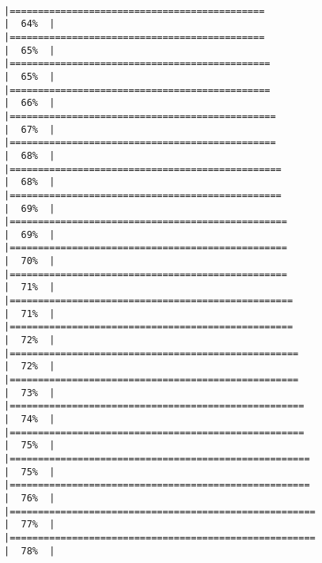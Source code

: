 \documentclass[12pt,twoside]{reedthesis}
\begin{document}
\begin{verbatim}
                                                                        |=============================================                         |  64%  |                                                                              |=============================================                         |  65%  |                                                                              |==============================================                        |  65%  |                                                                              |==============================================                        |  66%  |                                                                              |===============================================                       |  67%  |                                                                              |===============================================                       |  68%  |                                                                              |================================================                      |  68%  |                                                                              |================================================                      |  69%  |                                                                              |=================================================                     |  69%  |                                                                              |=================================================                     |  70%  |                                                                              |=================================================                     |  71%  |                                                                              |==================================================                    |  71%  |                                                                              |==================================================                    |  72%  |                                                                              |===================================================                   |  72%  |                                                                              |===================================================                   |  73%  |                                                                              |====================================================                  |  74%  |                                                                              |====================================================                  |  75%  |                                                                              |=====================================================                 |  75%  |                                                                              |=====================================================                 |  76%  |                                                                              |======================================================                |  77%  |                                                                              |======================================================                |  78%  |       
\end{verbatim}
\end{document}
